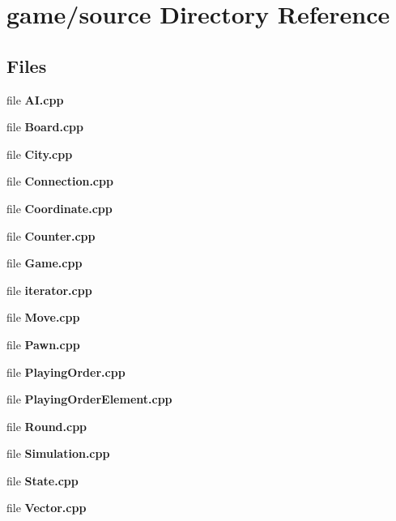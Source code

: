 \section{game/source Directory Reference}
\label{dir_8c261c8aced8bb6fb1c80541556eb04e}
\subsection*{Files}
\begin{DoxyCompactItemize}
\item 
file {\bfseries A\-I.\-cpp}
\item 
file {\bfseries Board.\-cpp}
\item 
file {\bfseries City.\-cpp}
\item 
file {\bfseries Connection.\-cpp}
\item 
file {\bfseries Coordinate.\-cpp}
\item 
file {\bfseries Counter.\-cpp}
\item 
file {\bfseries Game.\-cpp}
\item 
file {\bfseries iterator.\-cpp}
\item 
file {\bfseries Move.\-cpp}
\item 
file {\bfseries Pawn.\-cpp}
\item 
file {\bfseries Playing\-Order.\-cpp}
\item 
file {\bfseries Playing\-Order\-Element.\-cpp}
\item 
file {\bfseries Round.\-cpp}
\item 
file {\bfseries Simulation.\-cpp}
\item 
file {\bfseries State.\-cpp}
\item 
file {\bfseries Vector.\-cpp}
\end{DoxyCompactItemize}
